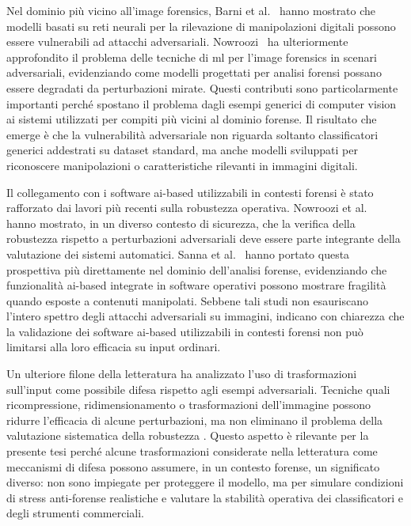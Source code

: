 Nel dominio più vicino all'image forensics, Barni et al.~\cite{barni2018cf}
hanno mostrato che modelli basati su reti neurali per la rilevazione di
manipolazioni digitali possono essere vulnerabili ad attacchi adversariali.
Nowroozi~\cite{nowroozi2020phd} ha ulteriormente approfondito il problema delle
tecniche di \gls{ml} per l'image forensics in scenari adversariali,
evidenziando come modelli progettati per analisi forensi possano essere
degradati da perturbazioni mirate. Questi contributi sono particolarmente
importanti perché spostano il problema dagli esempi generici di computer vision
ai sistemi utilizzati per compiti più vicini al dominio forense. Il risultato
che emerge è che la vulnerabilità adversariale non riguarda soltanto
classificatori generici addestrati su dataset standard, ma anche modelli
sviluppati per riconoscere manipolazioni o caratteristiche rilevanti in immagini
digitali.

Il collegamento con i software \gls{ai}-based utilizzabili in contesti forensi è
stato rafforzato dai lavori più recenti sulla robustezza operativa. Nowroozi et
al.~\cite{nowroozi2024verifying} hanno mostrato, in un diverso contesto di
sicurezza, che la verifica della robustezza rispetto a perturbazioni
adversariali deve essere parte integrante della valutazione dei sistemi
automatici. Sanna et al.~\cite{sanna2024preliminary,sanna2025pixelperfect}
hanno portato questa prospettiva più direttamente nel dominio dell'analisi
forense, evidenziando che funzionalità \gls{ai}-based integrate in software
operativi possono mostrare fragilità quando esposte a contenuti manipolati.
Sebbene tali studi non esauriscano l'intero spettro degli attacchi adversariali
su immagini, indicano con chiarezza che la validazione dei software
\gls{ai}-based utilizzabili in contesti forensi non può limitarsi alla loro
efficacia su input ordinari.

Un ulteriore filone della letteratura ha analizzato l'uso di trasformazioni
sull'input come possibile difesa rispetto agli esempi adversariali. Tecniche
quali ricompressione, ridimensionamento o trasformazioni dell'immagine possono
ridurre l'efficacia di alcune perturbazioni, ma non eliminano il problema della
valutazione sistematica della robustezza \cite{guo2017countering}. Questo
aspetto è rilevante per la presente tesi perché alcune trasformazioni considerate
nella letteratura come meccanismi di difesa possono assumere, in un contesto
forense, un significato diverso: non sono impiegate per proteggere il modello,
ma per simulare condizioni di stress anti-forense realistiche e valutare la
stabilità operativa dei classificatori e degli strumenti commerciali.

